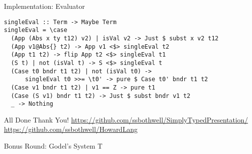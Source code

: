 \documentclass[presentation]{beamer}
\begin{document}
\begin{frame}[label={sec:org759f740},fragile]{Implementation: Evaluator}
 \begin{verbatim}
singleEval :: Term -> Maybe Term
singleEval = \case
  (App (Abs x ty t12) v2) | isVal v2 -> Just $ subst x v2 t12
  (App v1@Abs{} t2) -> App v1 <$> singleEval t2
  (App t1 t2) -> flip App t2 <$> singleEval t1
  (S t) | not (isVal t) -> S <$> singleEval t
  (Case t0 bndr t1 t2) | not (isVal t0) -> 
      singleEval t0 >>= \t0' -> pure $ Case t0' bndr t1 t2
  (Case v1 bndr t1 t2) | v1 == Z -> pure t1
  (Case (S v1) bndr t1 t2) -> Just $ subst bndr v1 t2
  _ -> Nothing
\end{verbatim}
\end{frame}
\begin{frame}[label={sec:orgf77070d}]{All Done}
\center
Thank You!
\url{https://github.com/ssbothwell/SimplyTypedPresentation/}
\url{https://github.com/ssbothwell/HowardLang}
\end{frame}
\begin{frame}[label={sec:org7f9c783}]{Bonus Round: Godel's System T}
\end{frame}
\end{document}
